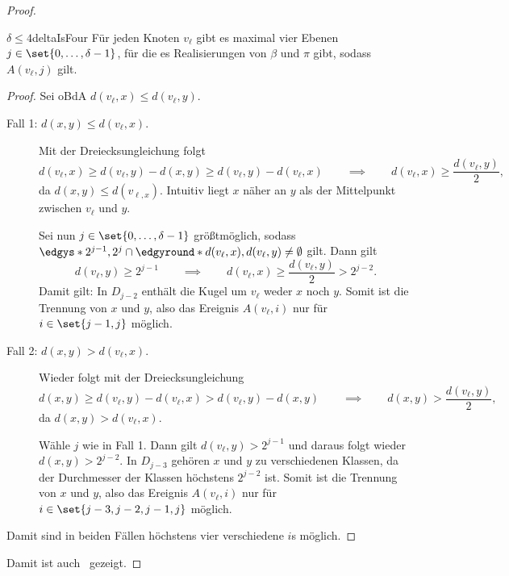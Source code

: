 \documentclass[language=ngerman,algolist]{TemplateLecture}
\begin{document}
\begin{proof}
    \begin{lem}{$\delta \leq 4$}{deltaIsFour}
        Für jeden Knoten $v_\ell$ gibt es maximal vier Ebenen $j \in \set{0,\ldots,\delta-1}$, für die es Realisierungen von $\beta$ und $\pi$ gibt, sodass $A(v_\ell, j)$ gilt.
    \end{lem}

    \begin{proof}
        Sei oBdA $d(v_\ell, x) \leq d(v_\ell, y)$.
        \begin{description}
            \item[Fall 1: $d(x,y) \leq d(v_\ell, x)$.] Mit der Dreiecksungleichung folgt 
            \begin{equation*}
                d(v_\ell, x) \geq d(v_\ell, y) - d(x,y) \geq d(v_\ell, y) - d(v_\ell, x) \qquad \implies \qquad d(v_\ell, x) \geq \frac{d(v_\ell, y)}{2},
            \end{equation*}
            da $d(x,y) \leq d(v_{\ell, x})$. Intuitiv liegt $x$ näher an $y$ als der Mittelpunkt zwischen $v_\ell$ und $y$.

            Sei nun $j \in \set{0,\ldots,\delta-1}$ größtmöglich, sodass $\edgys*{2^{j-1},2^j} \cap \edgyround*{d(v_\ell, x), d(v_\ell, y)} \neq \emptyset$ gilt. Dann gilt 
            \begin{equation*}
                d(v_\ell, y) \geq 2^{j-1} \qquad \implies \qquad d(v_\ell, x) \geq \frac{d(v_\ell, y)}{2} > 2^{j-2}.
            \end{equation*}
            Damit gilt: In $D_{j-2}$ enthält die Kugel um $v_\ell$ weder $x$ noch $y$. Somit ist die Trennung von $x$ und $y$, also das Ereignis $A(v_\ell, i)$ nur für $i \in \set{j-1, j}$ möglich.
            \item[Fall 2: $d(x,y) > d(v_\ell, x)$.] Wieder folgt mit der Dreiecksungleichung
            \begin{equation*}
                d(x,y) \geq d(v_\ell, y) - d(v_\ell, x) > d(v_\ell, y) - d(x,y) \qquad \implies \qquad d(x,y) > \frac{d(v_\ell, y)}{2},
            \end{equation*}
            da $d(x,y) > d(v_\ell, x)$.

            Wähle $j$ wie in Fall 1. Dann gilt $d(v_\ell, y) > 2^{j-1}$ und daraus folgt wieder $d(x,y) > 2^{j-2}$. In $D_{j-3}$ gehören $x$ und $y$ zu verschiedenen Klassen, da der Durchmesser der Klassen höchstens $2^{j-2}$ ist. Somit ist die Trennung von $x$ und $y$, also das Ereignis $A(v_\ell, i)$ nur für $i \in \set{j-3, j-2, j-1, j}$ möglich.
        \end{description}
        Damit sind in beiden Fällen höchstens vier verschiedene $i$s möglich.
    \end{proof}
    Damit ist auch~ gezeigt.
\end{proof}
\end{document}
